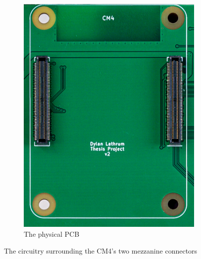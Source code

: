 \begin{figure}[b!]
\begin{subfigure}{.33\textwidth}
    \includegraphics[width=.95\linewidth]{Figures/pcb/crops/cm4}
    \caption{The physical PCB}
    \label{fig:CM4CircuitReal}
  \end{subfigure}
  \caption{The circuitry surrounding the CM4's two mezzanine connectors}
  \label{fig:CM4Circuit}
\end{figure}

